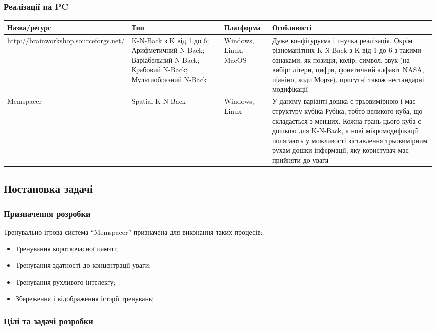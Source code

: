 \subsubsection{Реалізації на PC}
\small\begin{longtable}{| C{3.5cm} | C{4cm} | C{1.8cm} | C{5.2cm} |}
  \hline
  Назва/ресурс & Тип & Платформа & Особливості \\
  \hline
  \url{http://brainworkshop.sourceforge.net/}
  & K-N-Back з K від 1 до 6; Арифметичний N-Back; Варіабельний N-Back;
  Крабовий N-Back; Мультиобразний N-Back
  & Windows, Linux, MacOS
  & Дуже конфігуруєма і гнучка реалізація. Окрім різноманітних K-N-Back з K від 1 до 6
  з такими ознаками, як позиція, колір, символ, звук
  (на вибір: літери, цифри, фонетичний алфавіт NASA, піаніно, коди Морзе),
  присутні також нестандарні модифікації \\
  \hline
  Memspacer
  & Spatial K-N-Back
  & Windows, Linux
  & У даному варіанті дошка є трьовимірною і має структуру кубіка Рубіка, тобто великого куба,
  що складається з менших. Кожна грань цього куба є дошкою для K-N-Back,
  а нові мікромодифікації полягають у можливості зіставлення трьовимірним рухам дошки інформації,
  яку користувач має прийняти до уваги \\
  \hline
\end{longtable}\normalsize

\subsection{Постановка задачі}

\subsubsection{Призначення розробки}

Тренувально-ігрова система “Memspacer” призначена для виконання таких процесів:

\begin{itemize}
  \item Тренування короткочасної памяті;
  \item Тренування здатності до концентрації уваги;
  \item Тренування рухливого інтелекту;
  \item Збереження і відображення історії тренувань;
\end{itemize}

\subsubsection{Цілі та задачі розробки}

